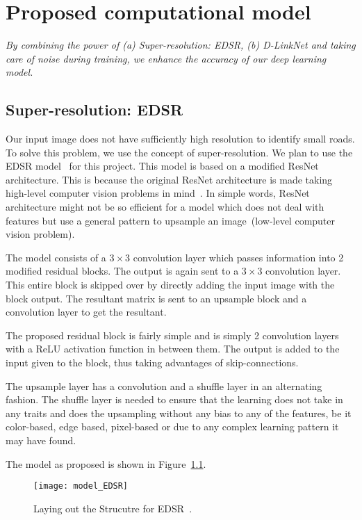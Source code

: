 \chapter{Proposed computational model}\label{chapt:model}
\textit{By combining the power of (a) Super-resolution: EDSR, (b) D-LinkNet and taking care of noise during training, we enhance the accuracy of our deep learning model.}

\section{Super-resolution: EDSR}
Our input image does not have sufficiently high resolution to identify small roads. To solve this problem, we use the concept of super-resolution. We plan to use the EDSR model~\cite{EDSR} for this project. This model is based on a modified ResNet architecture. This is because the original ResNet architecture is made taking high-level computer vision problems in mind~\cite{khan2019surveyResNet}. In simple words, ResNet architecture might not be so efficient for a model which does not deal with features but use a general pattern to upsample an image~(low-level computer vision problem). 

The model consists of a $3\times3$ convolution layer which passes information into 2 modified residual blocks. The output is again sent to a $3\times3$ convolution layer. This entire block is skipped over by directly adding the input image with the block output. The resultant matrix is sent to an upsample block and a convolution layer to get the resultant.

The proposed residual block is fairly simple and is simply 2 convolution layers with a ReLU activation function in between them. The output is added to the input given to the block, thus taking advantages of skip-connections.

The upsample layer has a convolution and a shuffle layer in an alternating fashion. The shuffle layer is needed to ensure that the learning does not take in any traits and does the upsampling without any bias to any of the features, be it color-based, edge based, pixel-based or due to any complex learning pattern it may have found.

The model as proposed is shown in Figure~\ref{fig:model_EDSR}.

\begin{figure}[h!]
  \centering
  \texttt{[image: model\_EDSR]}
  \caption[Laying out the Strucutre for EDSR]{Laying out the Strucutre for EDSR~\cite{EDSR}.}
  \label{fig:model_EDSR}
\end{figure}


